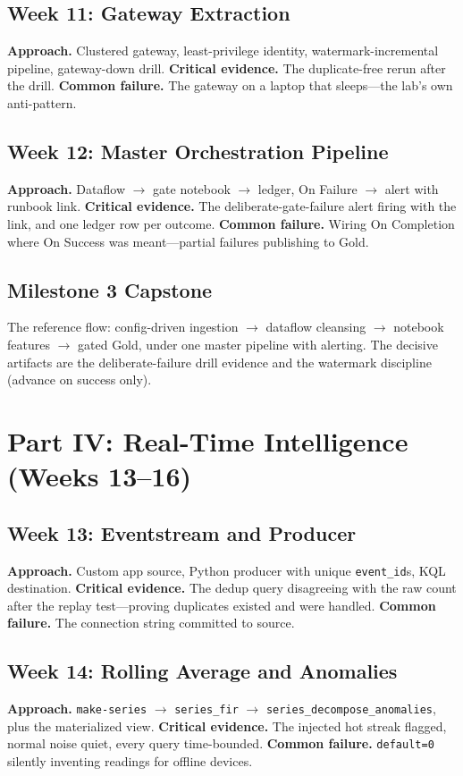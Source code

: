 \subsection{Week 11: Gateway Extraction}
\textbf{Approach.} Clustered gateway, least-privilege identity, watermark-incremental pipeline,
gateway-down drill. \textbf{Critical evidence.} The duplicate-free rerun after the drill.
\textbf{Common failure.} The gateway on a laptop that sleeps---the lab's own anti-pattern.

\subsection{Week 12: Master Orchestration Pipeline}
\textbf{Approach.} Dataflow $\rightarrow$ gate notebook $\rightarrow$ ledger, On Failure $\rightarrow$
alert with runbook link. \textbf{Critical evidence.} The deliberate-gate-failure alert firing with
the link, and one ledger row per outcome. \textbf{Common failure.} Wiring On Completion where On
Success was meant---partial failures publishing to Gold.

\subsection{Milestone 3 Capstone}
The reference flow: config-driven ingestion $\rightarrow$ dataflow cleansing $\rightarrow$ notebook
features $\rightarrow$ gated Gold, under one master pipeline with alerting. The decisive artifacts
are the deliberate-failure drill evidence and the watermark discipline (advance on success only).

\section{Part IV: Real-Time Intelligence (Weeks 13--16)}
\subsection{Week 13: Eventstream and Producer}
\textbf{Approach.} Custom app source, Python producer with unique \texttt{event\_id}s, KQL
destination. \textbf{Critical evidence.} The dedup query disagreeing with the raw count after the
replay test---proving duplicates existed and were handled. \textbf{Common failure.} The
connection string committed to source.

\subsection{Week 14: Rolling Average and Anomalies}
\textbf{Approach.} \texttt{make-series} $\rightarrow$ \texttt{series\_fir} $\rightarrow$
\texttt{series\_decompose\_anomalies}, plus the materialized view. \textbf{Critical evidence.} The
injected hot streak flagged, normal noise quiet, every query time-bounded. \textbf{Common
failure.} \texttt{default=0} silently inventing readings for offline devices.

